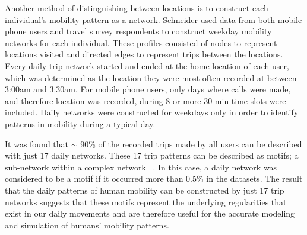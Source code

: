 Another method of distinguishing between locations is to construct each individual's mobility pattern as a network. Schneider \et\cite{schneider_2013_unravelling} used data from both mobile phone users and travel survey respondents to construct weekday mobility networks for each individual. These profiles consisted of nodes to represent locations visited and directed edges to represent trips between the locations. Every daily trip network started and ended at the home location of each user, which was determined as the location they were most often recorded at between 3:00am and 3:30am. For mobile phone users, only days where calls were made, and therefore location was recorded, during 8 or more 30-min time slots were included. Daily networks were constructed for weekdays only in order to identify patterns in mobility during a typical day.


It was found that $\sim$ 90\% of the recorded trips made by all users can be described with just 17 daily networks. These 17 trip patterns can be described as motifs; a sub-network within a complex network ~\cite{alon_2007_network}. In this case, a daily network was considered to be a motif if it occurred more than 0.5\% in the datasets. The result that the daily patterns of human mobility can be constructed by just 17 trip networks suggests that these motifs represent the underlying regularities that exist in our daily movements and are therefore useful for the accurate modeling and simulation of humans' mobility patterns.

